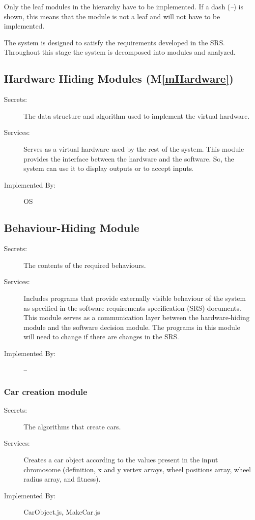 \documentclass[12pt, titlepage]{article}
\newcommand{\mref}[1]{M\ref{#1}}
\begin{document}
Only the leaf modules in the
hierarchy have to be implemented. If a dash (\emph{--}) is shown, this means
that the module is not a leaf and will not have to be implemented. 

The system is designed to satisfy the requirements developed in the SRS. 
Throughout
this stage the system is decomposed into modules and analyzed.

\subsection{Hardware Hiding Modules (\mref{mHardware})}

\begin{description}
\item[Secrets:]The data structure and algorithm used to implement the virtual
  hardware.
\item[Services:]Serves as a virtual hardware used by the rest of the
  system. This module provides the interface between the hardware and the
  software. So, the system can use it to display outputs or to accept inputs.
\item[Implemented By:] OS
\end{description}

\subsection{Behaviour-Hiding Module}

\begin{description}
\item[Secrets:]The contents of the required behaviours.
\item[Services:]Includes programs that provide externally visible behaviour of
  the system as specified in the software requirements specification (SRS)
  documents. This module serves as a communication layer between the
  hardware-hiding module and the software decision module. The programs in this
  module will need to change if there are changes in the SRS.
\item[Implemented By:] --
\end{description}

\subsubsection{Car creation module}

\begin{description}
\item[Secrets:] The algorithms that create cars.
\item[Services:] Creates a car object according to the values present in the 
input chromosome (definition, x and y vertex arrays, wheel positions array, 
wheel radius array, and fitness).
\item[Implemented By:] \color{RoyalPurple}CarObject.js, MakeCar.js
\end{description}
\end{document}
